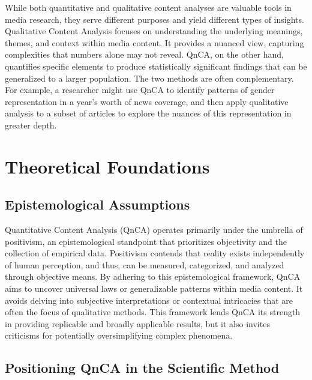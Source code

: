 \documentclass[
  b5paper]{book}
\begin{document}
While both quantitative and qualitative content analyses are valuable tools in media research, they serve different purposes and yield different types of insights. Qualitative Content Analysis focuses on understanding the underlying meanings, themes, and context within media content. It provides a nuanced view, capturing complexities that numbers alone may not reveal. QnCA, on the other hand, quantifies specific elements to produce statistically significant findings that can be generalized to a larger population. The two methods are often complementary. For example, a researcher might use QnCA to identify patterns of gender representation in a year's worth of news coverage, and then apply qualitative analysis to a subset of articles to explore the nuances of this representation in greater depth.

\hypertarget{theoretical-foundations-1}{%
\section{Theoretical Foundations}\label{theoretical-foundations-1}}

\hypertarget{epistemological-assumptions}{%
\subsection*{Epistemological Assumptions}\label{epistemological-assumptions}}

Quantitative Content Analysis (QnCA) operates primarily under the umbrella of positivism, an epistemological standpoint that prioritizes objectivity and the collection of empirical data. Positivism contends that reality exists independently of human perception, and thus, can be measured, categorized, and analyzed through objective means. By adhering to this epistemological framework, QnCA aims to uncover universal laws or generalizable patterns within media content. It avoids delving into subjective interpretations or contextual intricacies that are often the focus of qualitative methods. This framework lends QnCA its strength in providing replicable and broadly applicable results, but it also invites criticisms for potentially oversimplifying complex phenomena.

\hypertarget{positioning-qnca-in-the-scientific-method}{%
\subsection*{Positioning QnCA in the Scientific Method}\label{positioning-qnca-in-the-scientific-method}}
\end{document}
